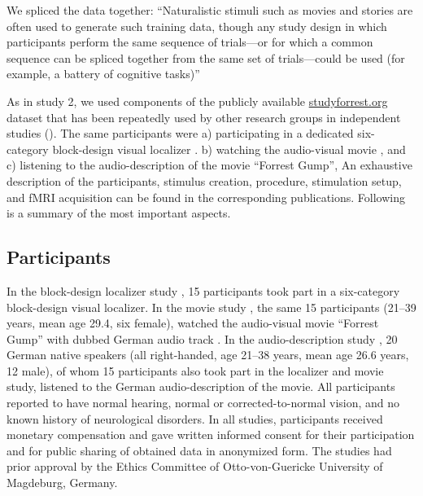 We spliced the data together: ``Naturalistic stimuli such as movies and stories
are often used to generate such training data, though any study design in which
participants perform the same sequence of trials—or for which a common sequence
can be spliced together from the same set of trials—could be used (for example,
a battery of cognitive tasks)'' \citep{cohen2017computational}

As in study 2, we
%
used components of the publicly available
\href{http://www.studyforrest.org}{studyforrest.org} dataset that has been
repeatedly used by other research groups in independent studies
(\citep[e.g.,][]{ben2018hippocampal, jiahui2020predicting, hu2017decoding,
lettieri2019emotionotopy, nguyen2016integration}).
The same participants were
a) participating in a dedicated six-category block-design visual localizer
\citep{sengupta2016extension}.
b) watching the audio-visual movie \citep{hanke2016simultaneous}, and
c) listening to the audio-description \citep{hanke2014audiomovie} of the movie
``Forrest Gump'',
An exhaustive description of the participants, stimulus creation, procedure,
stimulation setup, and fMRI acquisition can be found in the corresponding
publications. Following is a summary of the most important aspects.


\subsection{Participants}

In the block-design localizer study \citep{sengupta2016extension}, 15
participants took part in a six-category block-design visual localizer.
In the movie study \citep{hanke2016simultaneous}, the same 15 participants
(21–39 years, mean age 29.4, six female), watched the audio-visual movie
``Forrest Gump'' \citep{ForrestGumpMovie} with dubbed German audio track
\citep{ForrestGumpDVD}.
In the audio-description study \citep{hanke2014audiomovie}, 20 German native
speakers (all right-handed, age 21–38 years, mean age 26.6 years, 12 male), of
whom 15 participants also took part in the localizer and movie study, listened
to the German audio-description \citep{ForrestGumpGermanAD} of the movie.
All participants reported to have normal hearing, normal or corrected-to-normal
vision, and no known history of neurological disorders.
In all studies, participants received monetary compensation and gave written
informed consent for their participation and for public sharing of obtained data
in anonymized form. The studies had prior approval by the Ethics Committee of
Otto-von-Guericke University of Magdeburg, Germany.


